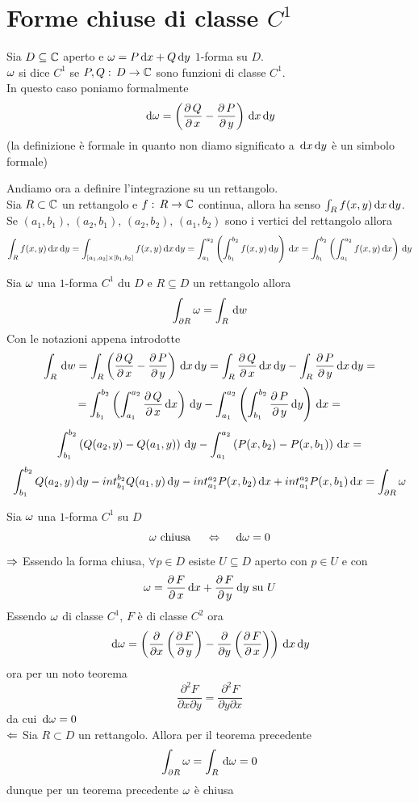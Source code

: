 \section{Forme chiuse di classe $C^1$}
\begin{defn}Sia $D\subseteq \mathbb{C}$ 
aperto e $\omega=P \, \mathrm{d}x + Q\, \mathrm{d}y $ $1$-forma su $D$.\\
$\omega$ si dice $C^1$ se $P,Q:\, D\to \mathbb{C}$ sono funzioni di classe $C^1$.\\
In questo caso poniamo formalmente
$$ \, \mathrm{d} \omega = \left( \frac{\partial \, Q}{\partial\, x}- \frac{\partial \, P}{\partial\, y}  \right)\, \mathrm{d}x \, \mathrm{d}y$$
(la definizione \`e formale in quanto non diamo significato a $\, \mathrm{d}x\, \mathrm{d}y$ \`e un simbolo formale)
\end{defn}
\spazio
Andiamo ora a definire l'integrazione su un rettangolo.\\
Sia $R\subset \mathbb{C}$ un rettangolo e $f:\, R \to \mathbb{C}$ continua, allora ha senso $\int_R f(x,y) \, \mathrm{d}x\, \mathrm{d}y$.\\
Se $(a_1,b_1), \, (a_2, b_1),\, (a_2, b_2), \, (a_1,b_2)$ sono i vertici del rettangolo allora 
$$ \int_R f(x,y)\, \mathrm{d}x\, \mathrm{d}y = \int_{[a_1,a_2]\times [b_1, b_2]} f(x,y) \, \mathrm{d}x \, \mathrm{d}y = \int_{a_1}^{a_2}\left( \int_{b_1}^{b_2} f(x,y) \, \mathrm{d}y \right) \, \mathrm{d}x = 
\int_{b_1}^{b_2}\left( \int_{a_1}^{a_2} f(x,y) \, \mathrm{d}x \right) \, \mathrm{d}y$$
\begin{thm}
Sia $\omega$ una $1$-forma $C^1$ du $D$ e $R\subseteq D$ un rettangolo allora
$$ \int_{\partial R } \omega = \int_R \, \mathrm{d} w$$
\proof Con le notazioni appena introdotte
$$ \int_R \, \mathrm{d} w = \int_R \left( \frac{\partial \, Q}{\partial\, x} - \frac{\partial \, P}{\partial\, y}  \right)\, \mathrm{d}x\, \mathrm{d}y = \int_R \frac{\partial \, Q}{\partial\, x} \, \mathrm{d}x \, \mathrm{d}y - \int_R \frac{\partial \, P}{\partial\, y} \, \mathrm{d}x \, \mathrm{d}y = $$
$$=\int_{b_1}^{b_2} \left(  \int_{a_1}^{a_2} \frac{\partial \, Q}{\partial\, x} \, \mathrm{d}x \right) \, \mathrm{d}y - \int_{a_1}^{a_2} \left(  \int_{b_1}^{b_2} \frac{\partial \, P}{\partial\, y} \, \mathrm{d}y \right) \, \mathrm{d}x =$$
$$ \int_{b_1}^{b_2} \left(  Q(a_2, y) -Q(a_1,y) \right) \, \mathrm{d}y - \int_{a_1}^{a_2} \left(  P(x,b_2) - P(x,b_1) \right) \, \mathrm{d}x =$$
$$ \int_{b_1}^{b_2} Q(a_2,y)\, \mathrm{d}y -int_{b_1}^{b_2} Q(a_1,y) \, \mathrm{d}y - int_{a_1}^{a_2} P(x,b_2) \, \mathrm{d}x + int_{a_1}^{a_2} P(x,b_1) \, \mathrm{d}x = \int_{\partial R } \omega$$
\endproof 
\end{thm}
\spazio
\begin{thm}Sia $\omega$ una $1$-forma $C^1$ su $D$ 
$$ \omega \text{ chiusa } \quad \Leftrightarrow \quad \, \mathrm{d} \omega =0$$
\proof $\Rightarrow $ Essendo la forma chiusa, $\forall p\in D$ esiste $U\subseteq D$ aperto con $p\in U$ e con
$$ \omega = \frac{\partial \, F}{\partial\, x} \, \mathrm{d}x + \frac{\partial \, F}{\partial\, y} \, \mathrm{d}y \text{ su } U$$
Essendo $\omega$ di classe $C^1$, $F$ \`e di classe $C^2$ ora
$$ \, \mathrm{d} \omega = \left( \frac{\partial}{\partial x}\left( \frac{\partial \, F}{\partial\, y} \right) -  \frac{\partial}{\partial y}\left( \frac{\partial \, F}{\partial\, x} \right) \right) \, \mathrm{d}x \, \mathrm{d}y $$
ora per un noto teorema
$$ \frac{\partial^2 F}{\partial x \partial y } = \frac{\partial^2 F}{\partial y \partial x }$$
da cui $\, \mathrm{d} \omega=0$\\
$\Leftarrow$ Sia $R\subset D$ un  rettangolo. Allora  per il teorema precedente
$$ \int_{\partial R}\omega =\int_R \, \mathrm{d} \omega =0$$
dunque per un teorema precedente $\omega$ \`e chiusa 
\endproof
\end{thm}
